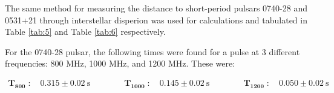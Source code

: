 \documentclass[12pt]{article}
\begin{document}
The same method for measuring the distance to short-period pulsars 0740-28 and 0531+21 through interstellar disperion was used for calculations and tabulated in Table \ref{tab:5} and Table \ref{tab:6} respectively.

For the 0740-28 pulsar, the following times were found for a pulse at 3 different frequencies: 800 MHz, 1000 MHz, and 1200 MHz. These were:

\vspace{-2ex}
\begin{gather*}
    \mathbf{T_{800}} \; : \quad 0.315 \pm 0.02 \:\text{s} \qquad\qquad \mathbf{T_{1000}} \; : \quad 0.145 \pm 0.02 \:\text{s} \qquad\qquad \mathbf{T_{1200}} \; : \quad 0.050 \pm 0.02 \:\text{s}
\end{gather*}

\begin{table}[H]
    \centering
    \caption{Distance to the 0740-28 pulsar through dispersion analysis using Eq. \ref{eq:3}.}
    \label{tab:5}
\end{table}
\end{document}
